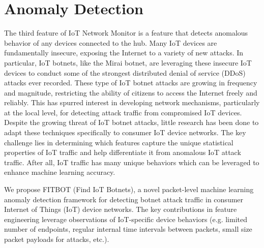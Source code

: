 \section{Anomaly Detection} 
The third feature of IoT Network Monitor is a feature that detects anomalous behavior of any devices connected to the hub. Many IoT devices are fundamentally insecure, exposing the Internet to a variety of new attacks. In particular, IoT botnets, like the Mirai botnet, are leveraging these insecure IoT devices to conduct some of the strongest distributed denial of service (DDoS) attacks ever recorded. These type of IoT botnet attacks are growing in frequency and magnitude, restricting the ability of citizens to access the Internet freely and reliably.
This has spurred interest in developing network mechanisms, particularly at the local level, for detecting attack traffic from compromised IoT devices. Despite the growing threat of IoT botnet attacks, little research has been done to adapt these techniques specifically to consumer IoT device networks. The key challenge lies in determining which features capture the unique statistical properties of IoT traffic and help differentiate it from anomalous IoT attack traffic. After all, IoT traffic has many unique behaviors which can be leveraged to enhance machine learning accuracy.

We propose FITBOT (Find IoT Botnets), a novel packet-level machine learning anomaly detection framework for detecting botnet attack traffic in consumer Internet of Things (IoT) device networks. The key contributions in feature engineering leverage observations of IoT-specific device behaviors (e.g. limited number of endpoints, regular internal time intervals between packets, small size packet payloads for attacks, etc.).

